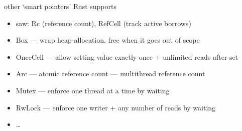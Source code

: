 
\begin{frame}{other `smart pointers' Rust supports}
    \begin{itemize}
        \item saw: Rc (reference count), RefCell (track active borrows)
        \item Box --- wrap heap-allocation, free when it goes out of scope
        \item OnceCell --- allow setting value exactly once + unlimited reads after set
        \item Arc --- atomic reference count --- multithread reference count
        \item Mutex --- enforce one thread at a time by waiting
        \item RwLock --- enforce one writer + any number of reads by waiting
        \item \ldots
    \end{itemize}
\end{frame}


